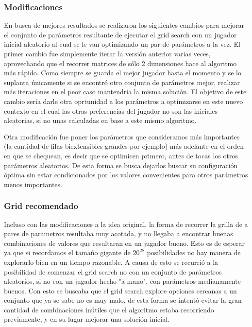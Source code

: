 \documentclass[A4paper,oneside,fleqn,11pt]{article}
\theoremstyle{definition}
\begin{document}
\subsubsection{Modificaciones}

En busca de mejores resultados se realizaron los siguientes cambios para mejorar el conjunto de parámetros resultante de ejecutar el grid search con un jugador inicial aleatorio al cual se le van optimizando un par de parámetros a la vez. El primer cambio fue simplemente iterar la versión anterior varias veces, aprovechando que el recorrer matrices de sólo 2 dimensiones hace al algoritmo más rápido. Como siempre se guarda el mejor jugador hasta el momento y se lo suplanta únicamente si se encontró otro conjunto de parámetros mejor, realizar más iteraciones en el peor caso mantendría la misma solución. El objetivo de este cambio sería darle otra oprtunidad a los parámetros a optimizarse en este nuevo contexto en el cual las otras preferencias del jugador no son las iniciales aleatorias, si no unas calculadas en base a este mismo algoritmo. 

Otra modificación fue poner los parámetros que consideramos más importantes (la cantidad de filas biextensibles grandes por ejemplo) más adelante en el orden en que se chequean, es decir que se optimicen primero, antes de tocas los otros parámetros aleatorios. De esta forma se busca dejarlos buscar su configuración óptima sin estar condicionados por los valores convenientes para otros parámetros menos importantes.




\subsubsection{Grid recomendado}

Incluso con las modificaciones a la idea original, la forma de recorrer la grilla de a pares de parametros resultaba muy acotada, y no llegaba a encontrar buenas combinaciones de valores que resultaran en un jugador bueno. Esto es de esperar ya que si recordamos el tamaño gigante de $ 20^{28}$ posibilidades no hay manera de explorarlo bien en un tiempo razonable. A causa de esto se recurrió a la posibilidad de comenzar el grid search no con un conjunto de parámetros aleatorios, si no con un jugador hecho "a mano", con parámetros medianamente buenos. Con esto se buscaba que el grid search explore opciones cercanas a un conjunto que ya se sabe no es muy malo, de esta forma se intentó evitar la gran cantidad de combinaciones inútiles que el algoritmo estaba recorriendo previamente, y en su lugar mejorar una solución inicial.
\end{document}
